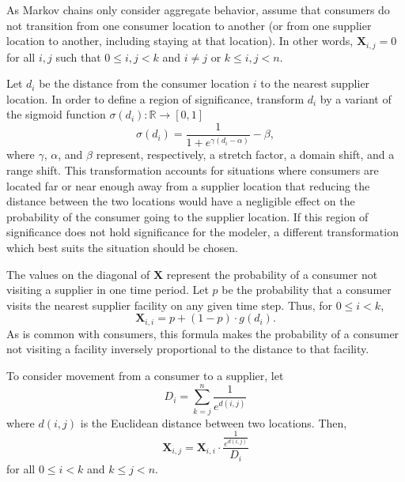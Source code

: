 \documentclass[twoside,twocolumn]{article}
\begin{document}
As Markov chains only consider aggregate behavior, assume that consumers do not transition from one consumer location to another (or from one supplier location to another, including staying at that location).
In other words, $\textbf{X}_{i, j} = 0$ for all $i, j$ such that $0 \leq i, j < k$  and $i \neq j$ or $k \leq i, j < n$.


Let $d_{i}$ be the distance from the consumer location $i$ to the nearest supplier location.
In order to define a region of significance, transform $d_i$ by a variant of the sigmoid function $\sigma(d_i): \mathbb{R} \rightarrow [0,1]$
\begin{equation}
\sigma(d_i) = \frac{1}{1 + e^{\gamma(d_i-\alpha)}} - \beta,
\end{equation}
where $\gamma$, $\alpha$, and $\beta$ represent, respectively, a stretch factor, a domain shift, and a range shift.
This transformation accounts for situations where consumers are located far or near enough away from a supplier location that reducing the distance  between the two locations would have a negligible effect on the probability of the consumer going to the supplier location.
If this region of significance does not hold significance for the modeler, a different transformation which best suits the situation should be chosen.

The values on the diagonal of $\textbf{X}$ represent the probability of a consumer not visiting a supplier in one time period.
Let $p$ be the probability that a consumer visits the nearest supplier facility 
on any given time step.
Thus, for $0 \leq i < k$, 
$$\textbf{X}_{i, i} = p + (1-p) \cdot g(d_{i}).$$
As is common with consumers, this formula makes the probability of a consumer not visiting a facility inversely proportional to the distance to that facility.

To consider movement from a consumer to a supplier, let
$$D_i = \sum_{k = j}^{n} \frac{1}{e^{d(i,j)}}$$
 where $d(i, j)$ is the Euclidean distance between two locations.
Then,
$$\textbf{X}_{i, j} = \textbf{X}_{i, i} \cdot \frac{\frac{1}{e^{d(i,j)}}}{D_i}$$
for all $0 \leq i < k$ and $k \leq j < n$.
\end{document}
